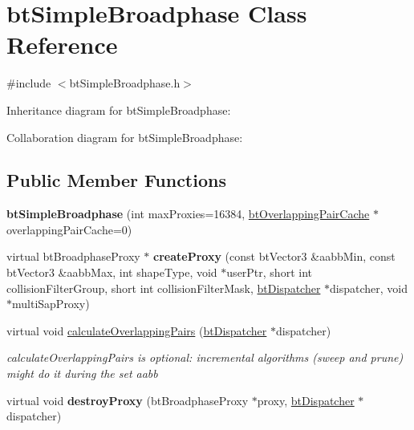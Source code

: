 \hypertarget{classbt_simple_broadphase}{\section{bt\+Simple\+Broadphase Class Reference}
\label{classbt_simple_broadphase}
}


{\ttfamily \#include $<$bt\+Simple\+Broadphase.\+h$>$}



Inheritance diagram for bt\+Simple\+Broadphase\+:


Collaboration diagram for bt\+Simple\+Broadphase\+:
\subsection*{Public Member Functions}
\begin{DoxyCompactItemize}
\item 
\hypertarget{classbt_simple_broadphase_ab9fe91cf132bed4e0e36073fc25e0e20}{{\bfseries bt\+Simple\+Broadphase} (int max\+Proxies=16384, \hyperlink{classbt_overlapping_pair_cache}{bt\+Overlapping\+Pair\+Cache} $\ast$overlapping\+Pair\+Cache=0)}\label{classbt_simple_broadphase_ab9fe91cf132bed4e0e36073fc25e0e20}

\item 
\hypertarget{classbt_simple_broadphase_a5d4d2bb48a191b5c62050582f1ed1e6b}{virtual bt\+Broadphase\+Proxy $\ast$ {\bfseries create\+Proxy} (const bt\+Vector3 \&aabb\+Min, const bt\+Vector3 \&aabb\+Max, int shape\+Type, void $\ast$user\+Ptr, short int collision\+Filter\+Group, short int collision\+Filter\+Mask, \hyperlink{classbt_dispatcher}{bt\+Dispatcher} $\ast$dispatcher, void $\ast$multi\+Sap\+Proxy)}\label{classbt_simple_broadphase_a5d4d2bb48a191b5c62050582f1ed1e6b}

\item 
virtual void \hyperlink{classbt_simple_broadphase_ac899d483e888fa132677125c88991de8}{calculate\+Overlapping\+Pairs} (\hyperlink{classbt_dispatcher}{bt\+Dispatcher} $\ast$dispatcher)
\begin{DoxyCompactList}\small\item\em calculate\+Overlapping\+Pairs is optional\+: incremental algorithms (sweep and prune) might do it during the set aabb \end{DoxyCompactList}\item 
\hypertarget{classbt_simple_broadphase_ac49ea7e0bd660d5541001ad7765d0e41}{virtual void {\bfseries destroy\+Proxy} (bt\+Broadphase\+Proxy $\ast$proxy, \hyperlink{classbt_dispatcher}{bt\+Dispatcher} $\ast$dispatcher)}\label{classbt_simple_broadphase_ac49ea7e0bd660d5541001ad7765d0e41}


\end{DoxyCompactItemize}
